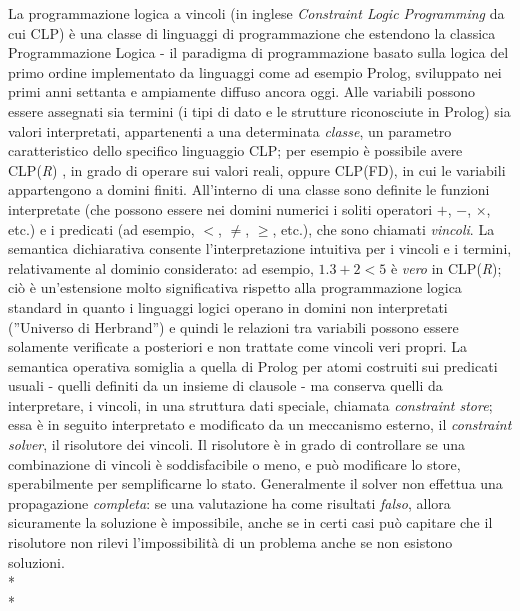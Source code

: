 \documentclass[12pt,a4paper,openright,twoside]{report}
\begin{document}
La programmazione logica a vincoli \cite{clpSurvey} (in inglese \emph{Constraint Logic Programming} da cui CLP) è una classe di linguaggi di programmazione che estendono la classica Programmazione Logica - il paradigma di programmazione basato sulla logica del primo ordine implementato da linguaggi come ad esempio Prolog, sviluppato nei primi anni settanta e ampiamente diffuso ancora oggi. Alle variabili possono essere assegnati sia termini (i tipi di dato e le strutture riconosciute in Prolog) sia valori interpretati, appartenenti a una determinata \emph{classe}, un parametro caratteristico dello specifico linguaggio CLP; per esempio è possibile avere CLP(\emph{R}) \cite{clpR}, in grado di operare sui valori reali, oppure CLP(FD), in cui le variabili appartengono a domini finiti. All'interno di una classe sono definite le funzioni interpretate (che possono essere nei domini numerici i soliti operatori $+$, $-$, $\times$, etc.) e i predicati (ad esempio, $<$, $\neq$, $\geq$, etc.), che sono chiamati \emph{vincoli}. La semantica dichiarativa consente l'interpretazione intuitiva per i vincoli e i termini, relativamente al dominio considerato: ad esempio, $1.3+2<5$ è \emph{vero} in CLP(\emph{R}); ciò è un'estensione molto significativa rispetto alla programmazione logica standard in quanto i linguaggi logici operano in domini non interpretati (''Universo di Herbrand'') e quindi le relazioni tra variabili possono essere solamente verificate a posteriori e non trattate come vincoli veri propri. La semantica operativa somiglia a quella di Prolog per atomi costruiti sui predicati usuali - quelli definiti da un insieme di clausole - ma conserva quelli da interpretare, i vincoli, in una struttura dati speciale, chiamata \emph{constraint store}; essa è in seguito interpretato e modificato da un meccanismo esterno, il \emph{constraint solver}, il risolutore dei vincoli. Il risolutore è in grado di controllare se una combinazione di vincoli è soddisfacibile o meno, e può modificare lo store, sperabilmente per semplificarne lo stato. Generalmente il solver non effettua una propagazione \emph{completa}: se una valutazione ha come risultati \emph{falso}, allora sicuramente la soluzione è impossibile, anche se in certi casi può capitare che il risolutore non rilevi l'impossibilità di un problema anche se non esistono soluzioni.\\*\\*  
\end{document}
